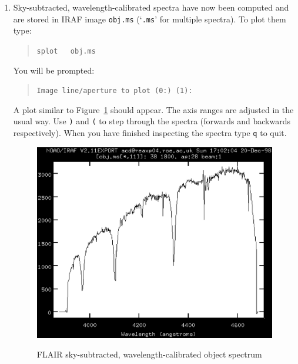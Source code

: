 \documentclass[twoside,11pt]{article}
\begin{document}
\begin{enumerate}
  \begin{quote}
   {\tt Sky rejection option (none|minmax|avsigclip) (none):}
  \end{quote}

   reply {\tt avsigclip}.  {\tt dofibers} then terminates.

  \item Sky-subtracted, wavelength-calibrated spectra have now been
   computed and are stored in IRAF image {\tt obj.ms} (`{\tt .ms}' for
   multiple spectra).  To plot them type:

  \begin{quote}
   {\tt splot ~ obj.ms}
  \end{quote}

   You will be prompted:

  \begin{quote}
   {\tt Image line/aperture to plot (0:) (1):}
  \end{quote}

   A plot similar to Figure~\ref{FLAIR_OBJECT} should appear.
   The axis ranges are adjusted in the usual way.  Use {\tt )} and 
   {\tt (} to step through the spectra (forwards and backwards
   respectively).  When you have finished inspecting the spectra type
   {\tt q} to quit.  

  \begin{figure}[htbp]
     \centering
     \includegraphics[totalheight=4in]{sc14_flair_object.ps}
     \begin{quote}
     \caption{FLAIR sky-subtracted, wavelength-calibrated object
      spectrum
     \label{FLAIR_OBJECT} }
     \end{quote}
  \end{figure}

\end{enumerate}
\end{document}
